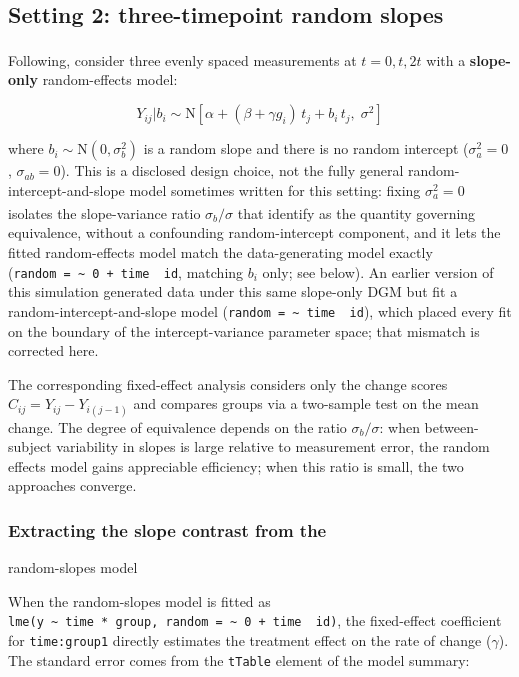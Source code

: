 \documentclass[
  11pt,
]{article}
\begin{document}
\subsection{Setting 2: three-timepoint random slopes}\label{setting-2-three-timepoint-random-slopes}

Following\textsuperscript{}, consider three evenly
spaced measurements at \(t = 0, t, 2t\) with a
\textbf{slope-only} random-effects model:

\[
Y_{ij} | b_i \sim
\mathrm{N}\!\left[\alpha + (\beta + \gamma g_i)\,
t_j + b_i\, t_j,\; \sigma^2\right]
\]

where \(b_i \sim \mathrm{N}(0, \sigma_b^2)\) is a random
slope and there is no random intercept (\(\sigma_a^2 =
0\), \(\sigma_{ab} = 0\)). This is a disclosed design
choice, not the fully general random-intercept-and-slope
model sometimes written for this setting: fixing
\(\sigma_a^2 = 0\) isolates the slope-variance ratio
\(\sigma_b / \sigma\) that\textsuperscript{} identify
as the quantity governing equivalence, without a
confounding random-intercept component, and it lets the
fitted random-effects model match the data-generating
model exactly (\texttt{random\ =\ \textasciitilde{}\ 0\ +\ time\ \textbar{}\ id}, matching
\(b_i\) only; see below). An earlier version of this
simulation generated data under this same slope-only
DGM but fit a random-intercept-and-slope model
(\texttt{random\ =\ \textasciitilde{}\ time\ \textbar{}\ id}), which placed every fit on the
boundary of the intercept-variance parameter space; that
mismatch is corrected here.

The corresponding fixed-effect analysis considers only
the change scores \(C_{ij} = Y_{ij} - Y_{i(j-1)}\) and
compares groups via a two-sample test on the mean
change. The degree of equivalence depends on the ratio
\(\sigma_b / \sigma\): when between-subject variability
in slopes is large relative to measurement error, the
random effects model gains appreciable efficiency;
when this ratio is small, the two approaches converge.

\subsubsection{Extracting the slope contrast from the}\label{extracting-the-slope-contrast-from-the}

random-slopes model

When the random-slopes model is fitted as
\texttt{lme(y\ \textasciitilde{}\ time\ *\ group,\ random\ =\ \textasciitilde{}\ 0\ +\ time\ \textbar{}\ id)},
the fixed-effect coefficient for \texttt{time:group1}
directly estimates the treatment effect on the rate
of change (\(\gamma\)). The standard error comes from
the \texttt{tTable} element of the model summary:
\end{document}

